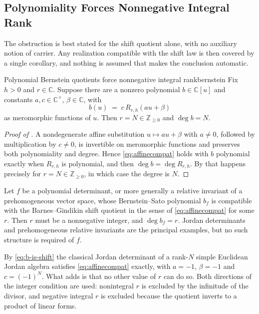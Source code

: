 \documentclass[11pt,letterpaper]{article}
\newcommand{\Zint}{\mathbb{Z}}
\newcommand{\Cc}{\mathbb{C}}
\newcommand{\Rm}{R}                          %
\begin{document}
\subsection{Polynomiality Forces Nonnegative Integral Rank}

The obstruction is best stated for the shift quotient alone, with no auxiliary
notion of carrier. Any realization compatible with the shift
law is then covered by a single corollary, and nothing is assumed that makes the
conclusion automatic.

\begin{proposition}{Polynomial Bernstein quotients force nonnegative integral rank}{bernstein}
Fix $h>0$ and $r\in\Cc$. Suppose there are a nonzero polynomial
$b\in\Cc[u]$ and constants $a,c\in\Cc^{\times}$, $\beta\in\Cc$, with
\begin{equation}
  b(u)\;=\;c\,\Rm_{r,h}(au+\beta)
  \label{eq:affinecompat}
\end{equation}
as meromorphic functions of $u$. Then $r=N\in\Zint_{\ge0}$ and $\deg b=N$.
\end{proposition}

\begin{proof}[Proof of ]
A nondegenerate affine substitution $u\mapsto au+\beta$ with $a\ne0$, followed by
multiplication by $c\ne0$, is invertible on meromorphic functions and preserves
both polynomiality and degree. Hence \eqref{eq:affinecompat} holds with $b$
polynomial exactly when $\Rm_{r,h}$ is polynomial, and then
$\deg b=\deg\Rm_{r,h}$. By  that happens precisely for
$r=N\in\Zint_{\ge0}$, in which case the degree is $N$.
\end{proof}

\begin{corollary}
\label{cor:carrier}
Let $f$ be a polynomial determinant, or more generally a relative invariant of a
prehomogeneous vector space, whose Bernstein--Sato polynomial $b_f$ is compatible
with the Barnes--Gindikin shift quotient in the sense of \eqref{eq:affinecompat}
for some $r$. Then $r$ must be a nonnegative integer, and $\deg b_f=r$. Jordan
determinants and prehomogeneous relative invariants are the principal examples,
but no such structure is required of $f$.
\end{corollary}

By \eqref{eq:b-is-shift} the
classical Jordan determinant of a rank-$N$ simple Euclidean Jordan algebra
satisfies \eqref{eq:affinecompat} exactly, with $a=-1$, $\beta=-1$ and
$c=(-1)^{N}$. What  adds is that no other value of $r$ can
do so. Both directions of the integer condition are used: nonintegral $r$ is
excluded by the infinitude of the divisor, and negative integral $r$ is excluded
because the quotient inverts to a product of linear forms.
\end{document}
